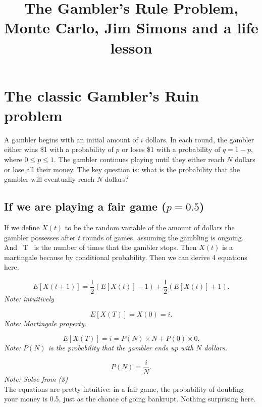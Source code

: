 \documentclass{article}
\title{The Gambler's Rule Problem, Monte Carlo, Jim Simons and a life lesson}
\begin{document}
\maketitle

\section{The classic Gambler’s Ruin problem}
A gambler begins with an initial amount of \(i\) dollars. In each round, the gambler either wins \$1 with a probability of \(p\) or loses \$1 with a probability of \(q = 1 - p\), where \(0 \leq p \leq 1\). The gambler continues playing until they either reach \(N\) dollars or lose all their money. The key question is: what is the probability that the gambler will eventually reach \(N\) dollars? 

\subsection{If we are playing a fair game  (\(p =0.5\))}
If we define \( X(t) \) to be the random variable of the amount of dollars the gambler possesses after \( t \) rounds of games, assuming the gambling is ongoing. And \ T \ is the number of times that the gambler stops.  Then \( X(t) \) is a martingale because by conditional probability. Then we can derive 4 equations here.

\begin{equation}
E[X(t+1)] = \frac{1}{2}(E[X(t)] - 1) + \frac{1}{2}(E[X(t)] + 1).
\label{eq:expected_value}
\end{equation}
\textit{Note: intuitively}

\begin{equation}
E[X(T)] = X(0) = i.
\label{eq:martingale_property}
\end{equation}
\textit{Note: Martingale property.}

\begin{equation}
E[X(T)] = i = P(N) \times N + P(0) \times 0.
\label{eq:probability}
\end{equation}
\textit{Note: \( P(N) \) is the probability that the gambler ends up with \( N \) dollars.}

\begin{equation}
P(N) = \frac{i}{N}.
\label{eq:solve}
\end{equation}
\textit{Note: Solve from (3)} \\ 

The equations are pretty intuitive: in a fair game, the probability of doubling your money is 0.5, just as the chance of going bankrupt. Nothing surprising here.
\end{document}

